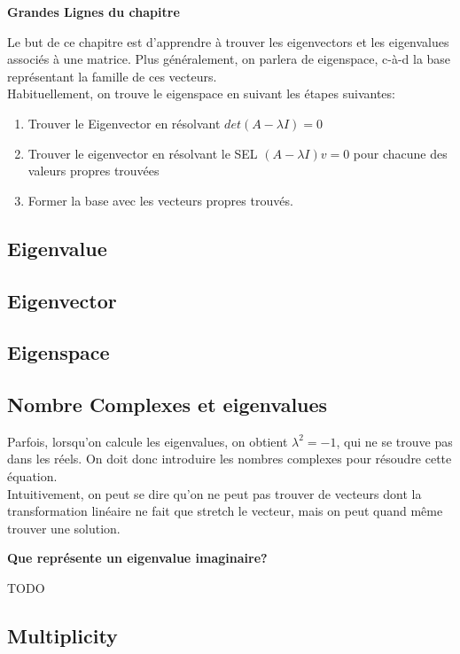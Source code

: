 \documentclass{article}
\begin{document}
\textbf{Grandes Lignes du chapitre}

Le but de ce chapitre est d'apprendre à trouver les eigenvectors et les
eigenvalues associés à une matrice. Plus généralement, on parlera de eigenspace,
c-à-d la base représentant la famille de ces vecteurs.\\

Habituellement, on trouve le eigenspace en suivant les étapes suivantes:
\begin{enumerate}
    \item Trouver le Eigenvector en résolvant $ det(A-\lambda I)=0$
    \item Trouver le eigenvector en résolvant le SEL $ (A - \lambda I)v=0 $
	pour chacune des valeurs propres trouvées
    \item Former la base avec les vecteurs propres trouvés.
\end{enumerate}

\subsection{Eigenvalue}%
\label{sub:Eigenvalue}

\subsection{Eigenvector}%
\label{sub:Eigenvector}

\subsection{Eigenspace}%
\label{sub:Eigenspace}

\subsection{Nombre Complexes et eigenvalues}

Parfois, lorsqu'on calcule les eigenvalues, on obtient $ \lambda ^ 2 = -1$,
qui ne se trouve pas dans les réels. On doit donc introduire les nombres
complexes pour résoudre cette équation.\\

Intuitivement, on peut se dire qu'on ne peut pas trouver de vecteurs dont la
transformation linéaire ne fait que stretch le vecteur, mais on peut quand
même trouver une solution.

\textbf{Que représente un eigenvalue imaginaire?}

TODO

\subsection{Multiplicity}%
\label{sub:Multiplicity}
\end{document}
